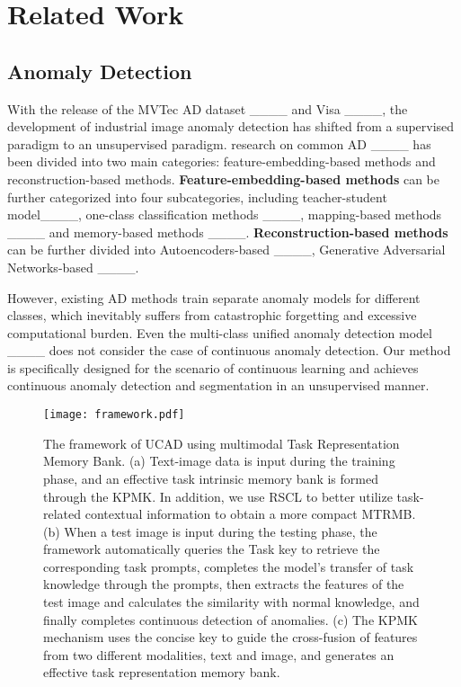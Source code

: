 \section{Related Work}
\subsection{Anomaly Detection}
With the release of the MVTec AD dataset ____ and Visa ____, the development of industrial image anomaly detection has shifted from a supervised paradigm to an unsupervised paradigm. research on common AD ____ has been divided into two main categories: feature-embedding-based methods and reconstruction-based methods.
\textbf{Feature-embedding-based methods} can be further categorized into four subcategories, including teacher-student model____, one-class classification methods ____, mapping-based methods ____ and memory-based methods ____. \textbf{Reconstruction-based
methods} can be further divided into Autoencoders-based ____, Generative Adversarial Networks-based ____.

However, existing AD methods train separate anomaly models for different classes, which inevitably suffers from catastrophic forgetting and excessive computational burden. Even the multi-class unified anomaly detection model ____ does not consider the case of continuous anomaly detection. Our method is specifically designed for the scenario of continuous learning and achieves continuous anomaly detection and segmentation in an unsupervised manner.

\begin{figure*}[h]
	\centering 
	\texttt{[image: framework.pdf]} 
	\caption{The framework of UCAD using multimodal Task Representation Memory Bank.
    (a) Text-image data is input during the training phase, and an effective task intrinsic memory bank is formed through the KPMK. In addition, we use RSCL to better utilize task-related contextual information to obtain a more compact MTRMB. (b) When a test image is input during the testing phase, the framework automatically queries the Task key to retrieve the corresponding task prompts, completes the model's transfer of task knowledge through the prompts, then extracts the features of the test image and calculates the similarity with normal knowledge, and finally completes continuous detection of anomalies. (c) The KPMK mechanism uses the concise key to guide the cross-fusion of features from two different modalities, text and image, and generates an effective task representation memory bank.}
	\label{MTRMB} 
\end{figure*}

